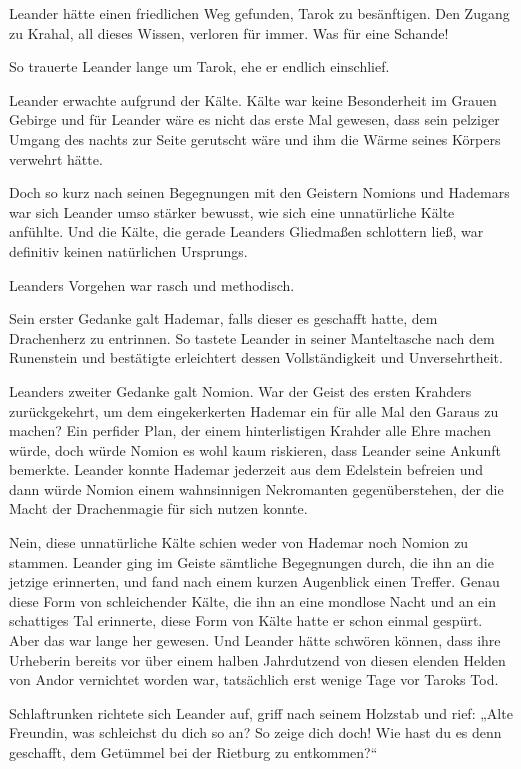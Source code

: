 Leander hätte einen friedlichen Weg gefunden, Tarok zu besänftigen. Den Zugang zu Krahal, all dieses Wissen, verloren für immer. Was für eine Schande!

So trauerte Leander lange um Tarok, ehe er endlich einschlief.



\trennzeichen



Leander erwachte aufgrund der Kälte. Kälte war keine Besonderheit im Grauen Gebirge und für Leander wäre es nicht das erste Mal gewesen, dass sein pelziger Umgang des nachts zur Seite gerutscht wäre und ihm die Wärme seines Körpers verwehrt hätte.

Doch so kurz nach seinen Begegnungen mit den Geistern Nomions und Hademars war sich Leander umso stärker bewusst, wie sich eine unnatürliche Kälte anfühlte. Und die Kälte, die gerade Leanders Gliedmaßen schlottern ließ, war definitiv keinen natürlichen Ursprungs.

Leanders Vorgehen war rasch und methodisch.

Sein erster Gedanke galt Hademar, falls dieser es geschafft hatte, dem Drachenherz zu entrinnen. So tastete Leander in seiner Manteltasche nach dem Runenstein und bestätigte erleichtert dessen Vollständigkeit und Unversehrtheit.

Leanders zweiter Gedanke galt Nomion. War der Geist des ersten Krahders zurückgekehrt, um dem eingekerkerten Hademar ein für alle Mal den Garaus zu machen? Ein perfider Plan, der einem hinterlistigen Krahder alle Ehre machen würde, doch würde Nomion es wohl kaum riskieren, dass Leander seine Ankunft bemerkte. Leander konnte Hademar jederzeit aus dem Edelstein befreien und dann würde Nomion einem wahnsinnigen Nekromanten gegenüberstehen, der die Macht der Drachenmagie für sich nutzen konnte.

Nein, diese unnatürliche Kälte schien weder von Hademar noch Nomion zu stammen. Leander ging im Geiste sämtliche Begegnungen durch, die ihn an die jetzige erinnerten, und fand nach einem kurzen Augenblick einen Treffer. Genau diese Form von schleichender Kälte, die ihn an eine mondlose Nacht und an ein schattiges Tal erinnerte, diese Form von Kälte hatte er schon einmal gespürt. Aber das war lange her gewesen. Und Leander hätte schwören können, dass ihre Urheberin bereits vor über einem halben Jahrdutzend von diesen elenden Helden von Andor vernichtet worden war, tatsächlich erst wenige Tage vor Taroks Tod.

Schlaftrunken richtete sich Leander auf, griff nach seinem Holzstab und rief: „Alte Freundin, was schleichst du dich so an? So zeige dich doch! Wie hast du es denn geschafft, dem Getümmel bei der Rietburg zu entkommen?“

